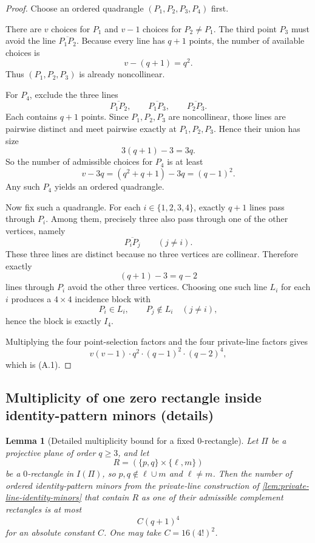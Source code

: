 \documentclass[11pt]{amsart}
\numberwithin{equation}{section}
\theoremstyle{plain}
\newtheorem{lemma}[theorem]{Lemma}
\theoremstyle{definition}
\theoremstyle{remark}
\begin{document}
\begin{proof}
Choose an ordered quadrangle $(P_1,P_2,P_3,P_4)$ first.

There are $v$ choices for $P_1$ and $v-1$ choices for $P_2\neq P_1$.
The third point $P_3$ must avoid the line $\overline{P_1P_2}$.
Because every line has $q+1$ points, the number of available choices is
\[
v-(q+1)=q^2.
\]
Thus $(P_1,P_2,P_3)$ is already noncollinear.

For $P_4$, exclude the three lines
\[
\overline{P_1P_2},\qquad \overline{P_1P_3},\qquad \overline{P_2P_3}.
\]
Each contains $q+1$ points.
Since $P_1,P_2,P_3$ are noncollinear, those lines are pairwise distinct and meet pairwise exactly at $P_1,P_2,P_3$.
Hence their union has size
\[
3(q+1)-3=3q.
\]
So the number of admissible choices for $P_4$ is at least
\[
v-3q=(q^2+q+1)-3q=(q-1)^2.
\]
Any such $P_4$ yields an ordered quadrangle.

Now fix such a quadrangle.
For each $i\in\{1,2,3,4\}$, exactly $q+1$ lines pass through $P_i$.
Among them, precisely three also pass through one of the other vertices, namely
\[
\overline{P_iP_j}\qquad (j\neq i).
\]
These three lines are distinct because no three vertices are collinear.
Therefore exactly
\[
(q+1)-3=q-2
\]
lines through $P_i$ avoid the other three vertices.
Choosing one such line $L_i$ for each $i$ produces a $4\times4$ incidence block with
\[
P_i\in L_i,\qquad P_j\notin L_i\quad (j\neq i),
\]
hence the block is exactly $I_4$.

Multiplying the four point-selection factors and the four private-line factors gives
\[
v(v-1)\cdot q^2\cdot (q-1)^2\cdot (q-2)^4,
\]
which is \textup{(A.1)}.
\end{proof}

\subsection{Multiplicity of one zero rectangle inside identity-pattern minors (details)}

\begin{lemma}[Detailed multiplicity bound for a fixed $0$-rectangle]
\label{lem:identity-rectangle-multiplicity-detailed}
Let $\Pi$ be a projective plane of order $q\ge 3$, and let
\[
R=(\{p,q\}\times \{\ell,m\})
\]
be a $0$-rectangle in $I(\Pi)$, so $p,q\notin \ell\cup m$ and $\ell\neq m$.
Then the number of ordered identity-pattern minors from the private-line construction of \cref{lem:private-line-identity-minors} that contain $R$ as one of their admissible complement rectangles is at most
\[
C(q+1)^4
\tag{A.2}
\]
for an absolute constant $C$.
One may take $C=16(4!)^2$.
\end{lemma}
\end{document}
